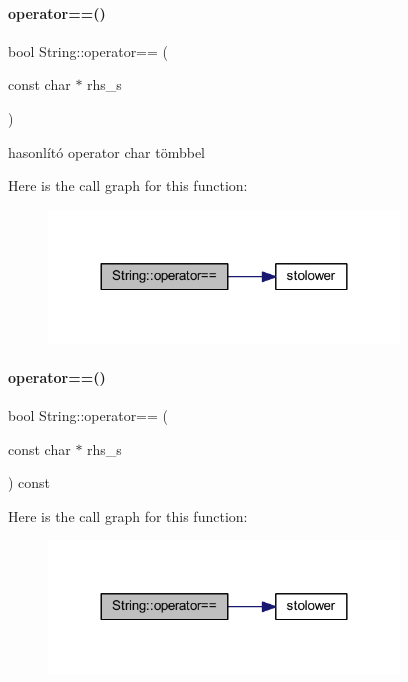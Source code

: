 \paragraph{\texorpdfstring{operator==()}{operator==()}\hspace{0.1cm}{\footnotesize\ttfamily [3/4]}}
{\footnotesize\ttfamily bool String\+::operator== (\begin{DoxyParamCaption}\item[{const char $\ast$}]{rhs\+\_\+s }\end{DoxyParamCaption})}



hasonlító operator char tömbbel 

Here is the call graph for this function\+:
\nopagebreak
\begin{figure}[H]
\begin{center}
\leavevmode
\includegraphics[width=264pt]{class_string_ade9af860a809548214837e33367e8835_cgraph}
\end{center}
\end{figure}
\mbox{\label{class_string_aa50c56cbbbc9956cb359a7617f13809b}} 
\paragraph{\texorpdfstring{operator==()}{operator==()}\hspace{0.1cm}{\footnotesize\ttfamily [4/4]}}
{\footnotesize\ttfamily bool String\+::operator== (\begin{DoxyParamCaption}\item[{const char $\ast$}]{rhs\+\_\+s }\end{DoxyParamCaption}) const}

Here is the call graph for this function\+:
\nopagebreak
\begin{figure}[H]
\begin{center}
\leavevmode
\includegraphics[width=264pt]{class_string_aa50c56cbbbc9956cb359a7617f13809b_cgraph}
\end{center}
\end{figure}
\mbox{\label{class_string_a1a7c5c39d4dafbbf8516f5058a253f1a}} 
